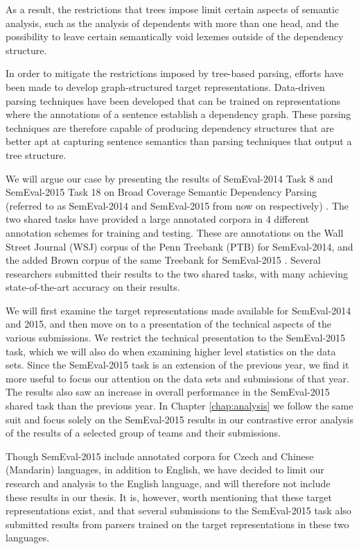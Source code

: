 As a result, the restrictions that trees impose limit certain aspects of semantic analysis, such as the analysis of dependents with more than one head, and the possibility to leave certain semantically void lexemes outside of the dependency structure. 

In order to mitigate the restrictions imposed by tree-based parsing, efforts have been made to develop graph-structured target representations. Data-driven parsing techniques have been developed that can be trained on representations where the annotations of a sentence establish a dependency graph. These parsing techniques are therefore capable of producing dependency structures that are better apt at capturing sentence semantics than parsing techniques that output a tree structure.

We will argue our case by presenting the results of SemEval-2014 Task 8 and SemEval-2015 Task 18 on Broad Coverage Semantic Dependency Parsing (referred to as SemEval-2014 and SemEval-2015 from now on respectively) \cite{Oepen:14, Oepen:15}. The two shared tasks have provided a large annotated corpora in 4 different annotation schemes for training and testing. These are annotations on the Wall Street Journal (WSJ) corpus of the Penn Treebank (PTB) for SemEval-2014, and the added Brown corpus of the same Treebank for SemEval-2015 \cite{Mar:San:Mar:93}. Several researchers submitted their results to the two shared tasks, with many achieving state-of-the-art accuracy on their results. 

We will first examine the target representations made available for SemEval-2014 and 2015, and then move on to a presentation of the technical aspects of the various submissions. We restrict the technical presentation to the SemEval-2015 task, which we will also do when examining higher level statistics on the data sets. Since the SemEval-2015 task is an extension of the previous year, we find it more useful to focus our attention on the data sets and submissions of that year. The results also saw an increase in overall performance in the SemEval-2015 shared task than the previous year. In Chapter \ref{chap:analysis} we follow the same suit and focus solely on the SemEval-2015 results in our contrastive error analysis of the results of a selected group of teams and their submissions.

Though SemEval-2015 include annotated corpora for Czech and Chinese (Mandarin) languages, in addition to English, we have decided to limit our research and analysis to the English language, and will therefore not include these results in our thesis. It is, however, worth mentioning that these target representations exist, and that several submissions to the SemEval-2015 task also submitted results from parsers trained on the target representations in these two languages.


